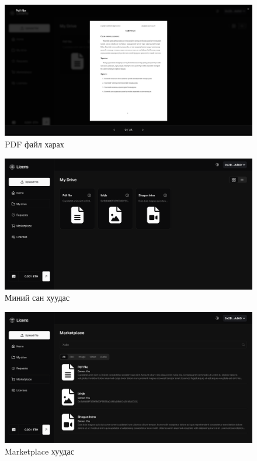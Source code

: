 \begin{figure}[h!]
	\centering
	\includegraphics[scale=0.16]{src/images/pdf-viewer.png}
	\caption{PDF файл харах}
\end{figure}

\begin{figure}[h!]
	\centering
	\includegraphics[scale=0.16]{src/images/drive.png}
	\caption{Миний сан хуудас}
\end{figure}

\begin{figure}[h!]
	\centering
	\includegraphics[scale=0.16]{src/images/marketplace.png}
	\caption{Marketplace хуудас}
\end{figure}


